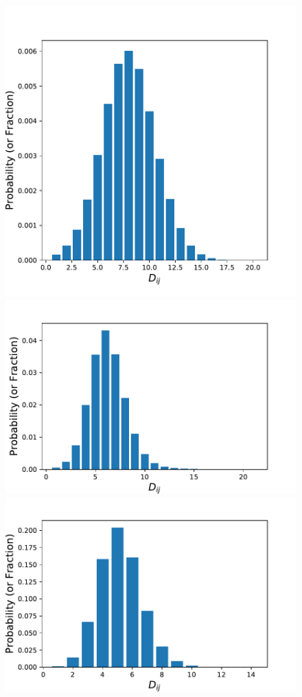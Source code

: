 \documentclass[aps, pre, twocolumn, nofootinbib]{revtex4-1}
\begin{document}
\begin{figure}[htbp]
	\includegraphics[scale = 0.33]{plots/Dij_dist_hist_1990}
	\includegraphics[scale = 0.33]{plots/Dij_dist_hist_2000}
	\includegraphics[scale = 0.33]{plots/Dij_dist_hist_2013}
	

\end{figure}
\end{document}
